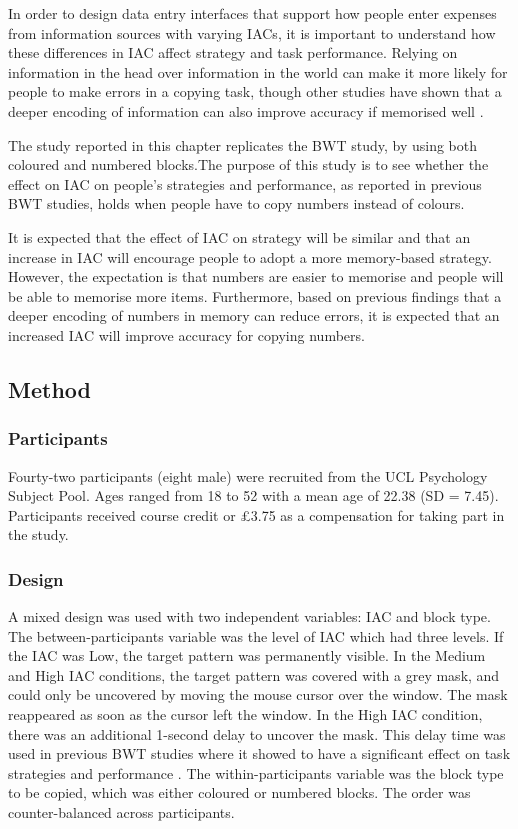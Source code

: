 \documentclass[11pt,oneside]{report}
\begin{document}
In order to design data entry interfaces that support how people enter expenses from information sources with varying IACs, it is important to understand how these differences in IAC affect strategy and task performance. Relying on information in the head over information in the world can make it more likely for people to make errors in a copying task\citep{Morgan2009}, though other studies have shown that a deeper encoding of information can also improve accuracy if memorised well \citep{Gray2004, Soboczenski2013}. 

The study reported in this chapter replicates the BWT study, by using both coloured and numbered blocks.The purpose of this study is to see whether the effect on IAC on people's strategies and performance, as reported in previous BWT studies, holds when people have to copy numbers instead of colours.

It is expected that the effect of IAC on strategy will be similar and that an increase in IAC will encourage people to adopt a more memory-based strategy.  However, the expectation is that numbers are easier to memorise and people will be able to memorise more items. Furthermore, based on previous findings that a deeper encoding of numbers in memory can reduce errors, it is expected that an increased IAC will improve accuracy for copying numbers.


\subsection{Method}
\subsubsection{Participants}
Fourty-two participants (eight male) were recruited from the UCL Psychology Subject Pool. Ages ranged from 18 to 52 with a mean age of 22.38 (SD = 7.45). Participants received course credit or \pounds3.75 as a compensation for taking part in the study.

\subsubsection{Design}
A mixed design was used with two independent variables: IAC and block type.
The between-participants variable was the level of IAC which had three levels. If the IAC was Low, the target pattern was permanently visible. In the Medium and High IAC conditions, the target pattern was covered with a grey mask, and could only be uncovered by moving the mouse cursor over the window. The mask reappeared as soon as the cursor left the window. In the High IAC condition, there was an additional 1-second delay to uncover the mask. This delay time was used in previous BWT studies where it showed to have a significant effect on task strategies and performance \citep{Gray2006, Morgan2009, Waldron2007}.
The within-participants variable was the block type to be copied, which was either coloured or numbered blocks. The order was counter-balanced across participants.
\end{document}
